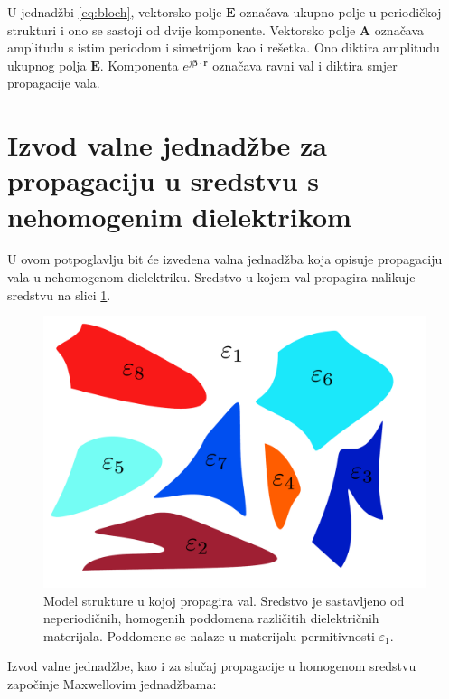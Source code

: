 \documentclass[utf8, seminar, numeric]{fer}
\begin{document}
U jednadžbi \ref{eq:bloch}, vektorsko polje $\mathbf{E}$ označava ukupno polje
u periodičkoj strukturi i ono se sastoji od dvije komponente. Vektorsko polje
$\mathbf{A}$ označava amplitudu s istim periodom i simetrijom kao i rešetka.
Ono diktira amplitudu ukupnog polja $\mathbf{E}$. Komponenta
${e^{j {\bm{\beta}} \cdot \mathbf{r}}}$ označava ravni val i diktira smjer
propagacije vala.




\section{Izvod valne jednadžbe za propagaciju u sredstvu s nehomogenim dielektrikom}

U ovom potpoglavlju bit će izvedena valna jednadžba koja opisuje propagaciju
vala u nehomogenom dielektriku. Sredstvo u kojem val propagira nalikuje sredstvu
na slici \ref{fig:structure}.

\begin{figure}[ht]
	\centering
	\includegraphics[width = 0.9\linewidth]{./images/pdf/structure-model.pdf}
	\caption{Model strukture u kojoj propagira val. Sredstvo je sastavljeno od
	neperiodičnih, homogenih poddomena različitih dielektričnih materijala.
	Poddomene se nalaze u materijalu permitivnosti $\varepsilon_1$.}
	\label{fig:structure}
\end{figure}

\FloatBarrier

Izvod valne jednadžbe, kao i za slučaj propagacije u homogenom sredstvu započinje
Maxwellovim jednadžbama:
\end{document}
